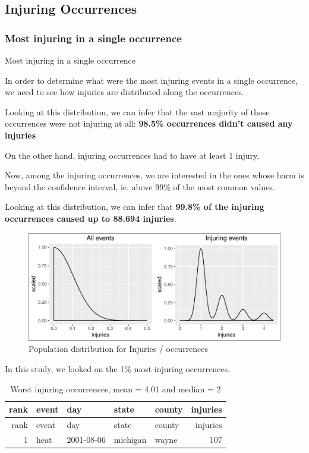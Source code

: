 \documentclass[]{article}
\begin{document}
\subsection{Injuring Occurrences}\label{injuring-occurrences}

\subsubsection{Most injuring in a single
occurrence}\label{most-injuring-in-a-single-occurrence}

Most injuring in a single occurrence

In order to determine what were the most injuring events in a single
occurrence, we need to see how injuries are distributed along the
occurrences.

Looking at this distribution, we can infer that the vast majority of
those occurrences were not injuring at all: \textbf{98.5\% occurrences
didn't caused any injuries}

On the other hand, injuring occurrences had to have at least 1 injury.

Now, among the injuring occurrences, we are interested in the ones whose
harm is beyond the confidence interval, ie. above 99\% of the most
common values.

Looking at this distribution, we can infer that \textbf{99.8\% of the
injuring occurrences caused up to 88.694 injuries}.

\begin{figure}[htbp]
\centering
\includegraphics{readme_files/figure-latex/inj-distribution-1.pdf}
\caption{Population distribution for Injuries / occurrences}
\end{figure}

In this study, we looked on the 1\% most injuring occurrences.

\begin{longtable}[]{@{}rllllr@{}}
\caption{Worst injuring occurrences, mean = 4.01 and median =
2}\tabularnewline
\toprule
rank & event & day & state & county & injuries\tabularnewline
\midrule
\endfirsthead
\toprule
rank & event & day & state & county & injuries\tabularnewline
\midrule
\endhead
1 & heat & 2001-08-06 & michigan & wayne & 107\tabularnewline
\bottomrule
\end{longtable}
\end{document}
